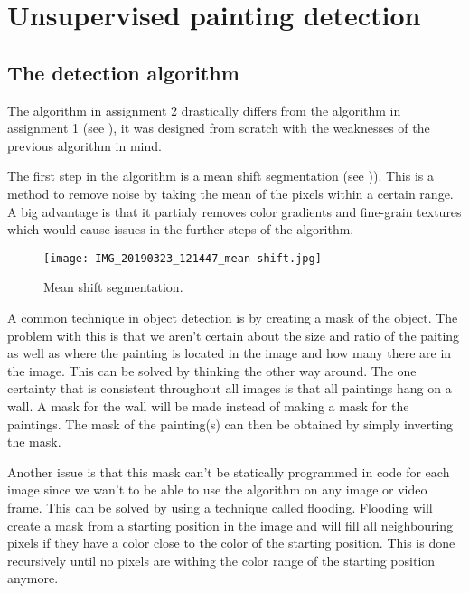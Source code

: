 \section{Unsupervised painting detection}
\label{sec:unsupervised_painting_detection}

\subsection{The detection algorithm}
\label{subsec:detection-algo}
The algorithm in assignment 2 drastically differs from the algorithm in assignment 1 (see ), it was designed from scratch with the weaknesses of the previous algorithm in mind.

The first step in the algorithm is a mean shift segmentation (see )). This is a method to remove noise by taking the mean of the pixels within a certain range. A big advantage is that it partialy removes color gradients and fine-grain textures which would cause issues in the further steps of the algorithm.

\begin{figure}[h]
    \texttt{[image: IMG\_20190323\_121447\_mean-shift.jpg]}
    \caption{Mean shift segmentation.}
    \label{fig:paiting_detection_mean_shift}
\end{figure}

A common technique in object detection is by creating a mask of the object. The problem with this is that we aren't certain about the size and ratio of the paiting as well as where the painting is located in the image and how many there are in the image. This can be solved by thinking the other way around. The one certainty that is consistent throughout all images is that all paintings hang on a wall. A mask for the wall will be made instead of making a mask for the paintings. The mask of the painting(s) can then be obtained by simply inverting the mask.

Another issue is that this mask can't be statically programmed in code for each image since we wan't to be able to use the algorithm on any image or video frame. This can be solved by using a technique called flooding. Flooding will create a mask from a starting position in the image and will fill all neighbouring pixels if they have a color close to the color of the starting position. This is done recursively until no pixels are withing the color range of the starting position anymore.

